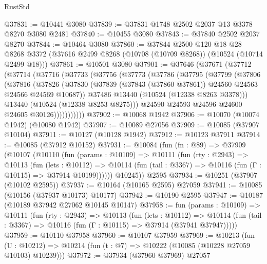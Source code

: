 \begin{lexlean}{RustStd}
\begin{coremodule}
@37831 := @10441 @3080
@37839 := @37831 @1748 @2502 @2037 @13 @3378 @8270 @3080 @2481
@37840 := @10455 @3080
@37843 := @37840 @2502 @2037 @8270
@37844 := @10464 @3080
@37860 := @37844
    @2500
    @120
    @18
    @28
    @8268
    @3372
    (@37616 @2499 @8268 (@10708 (@10709 @8268)) (@10524 (@10714 @2499 @18)))
@37861 := @10501 @3080
@37901 := @37646
    (@37671
      (@37712
        (@37714
          (@37716
            (@37733
              (@37756
                (@37773
                  (@37786
                    (@37795
                      (@37799
                        (@37806
                          (@37816
                            (@37826
                              (@37830
                                (@37839
                                  (@37843 (@37860 @37861))
                                  @24560
                                  @24563
                                  @24566
                                  @24569
                                  @10687))
                              @37486
                              @13440
                              (@10524 (@12338 @8263 @3378)))
                            @13440
                            (@10524 (@12338 @8253 @8275)))
                          @24590
                          @24593
                          @24596
                          @24600
                          @24605
                          @30126)))))))))))
@37902 := @10068 @1942
@37906 := @10070 (@10074 @1942) (@10080 @1942)
@37907 := @10089 @27056
@37909 := @10085 (@37907 @10104)
@37911 := @10127 (@10128 @1942)
@37912 := @10123 @37911
@37914 := @10085 (@37912 @10152)
@37931 := @10084
    (fun (fn : @89) =>
    @37909
      (@10107
        (@10110
          (fun (params : @10109) =>
          @10111
            (fun (rty : @2943) =>
            @10113
              (fun (lets : @10112) =>
              @10114 (fun (tail : @3367) => @10116 (fun (Γ : @10115) => @37914 @10199))))))
        @10245))
    @2595
@37934 := @10251 (@37907 (@10102 @2595))
@37937 := @10164 (@10165 @2595) @27059
@37941 := @10085 (@10156 (@37937 @10173) @10177)
@37942 := @10190 @2595
@37947 := @10187 (@10189 @37942 @27062 @10145 @10147)
@37958 := fun (params : @10109) =>
  @10111
    (fun (rty : @2943) =>
    @10113
      (fun (lets : @10112) =>
      @10114 (fun (tail : @3367) => @10116 (fun (Γ : @10115) => @37914 (@37941 @37947)))))
@37959 := @10110 @37958
@37960 := @10107 @37959
@37969 := @10213
    (fun (U : @10212) => @10214 (fun (t : @7) => @10222 (@10085 (@10228 @27059 @10103) @10239)))
@37972 := @37934 (@37960 @37969) @27057

\end{coremodule}
\end{lexlean}
